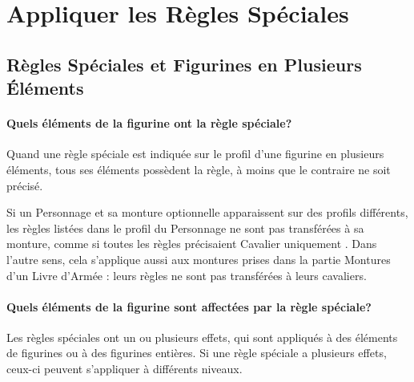 \newpage
\section{Appliquer les Règles Spéciales}
\label{applying_special_rules}

\subsection{Règles Spéciales et Figurines en Plusieurs Éléments}

\paragraph{Quels éléments de la figurine ont la règle spéciale?}

Quand une règle spéciale est indiquée sur le profil d'une figurine en plusieurs éléments, tous ses éléments possèdent la règle, à moins que le contraire ne soit précisé.

Si un Personnage et sa monture optionnelle apparaissent sur des profils différents, les règles listées dans le profil du Personnage ne sont pas transférées à sa monture, comme si toutes les règles précisaient \og Cavalier uniquement \fg{}. Dans l'autre sens, cela s'applique aussi aux montures prises dans la partie Montures d'un Livre d'Armée : leurs règles ne sont pas transférées à leurs cavaliers.

\paragraph{Quels éléments de la figurine sont affectées par la règle spéciale?}

Les règles spéciales ont un ou plusieurs effets, qui sont appliqués à des éléments de figurines ou à des figurines entières. Si une règle spéciale a plusieurs effets, ceux-ci peuvent s'appliquer à différents niveaux.

